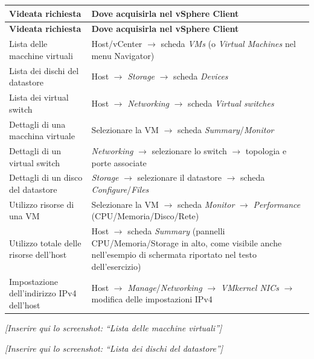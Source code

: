 \documentclass[11pt,a4paper]{article}
\begin{document}
\begin{center}
\begin{longtable}{p{6.2cm}p{6.6cm}}
\toprule
\textbf{Videata richiesta} & \textbf{Dove acquisirla nel vSphere Client} \\
\midrule
\endfirsthead
\toprule
\textbf{Videata richiesta} & \textbf{Dove acquisirla nel vSphere Client} \\
\midrule
\endhead
Lista delle macchine virtuali & Host/vCenter $\rightarrow$ scheda \emph{VMs} (o \emph{Virtual Machines} nel menu Navigator) \\
Lista dei dischi del datastore & Host $\rightarrow$ \emph{Storage} $\rightarrow$ scheda \emph{Devices} \\
Lista dei virtual switch & Host $\rightarrow$ \emph{Networking} $\rightarrow$ scheda \emph{Virtual switches} \\
Dettagli di una macchina virtuale & Selezionare la VM $\rightarrow$ scheda \emph{Summary}/\emph{Monitor} \\
Dettagli di un virtual switch & \emph{Networking} $\rightarrow$ selezionare lo switch $\rightarrow$ topologia e porte associate \\
Dettagli di un disco del datastore & \emph{Storage} $\rightarrow$ selezionare il datastore $\rightarrow$ scheda \emph{Configure}/\emph{Files} \\
Utilizzo risorse di una VM & Selezionare la VM $\rightarrow$ scheda \emph{Monitor} $\rightarrow$ \emph{Performance} (CPU/Memoria/Disco/Rete) \\
Utilizzo totale delle risorse dell'host & Host $\rightarrow$ scheda \emph{Summary} (pannelli CPU/Memoria/Storage in alto, come visibile anche nell'esempio di schermata riportato nel testo dell'esercizio) \\
Impostazione dell'indirizzo IPv4 dell'host & Host $\rightarrow$ \emph{Manage}/\emph{Networking} $\rightarrow$ \emph{VMkernel NICs} $\rightarrow$ modifica delle impostazioni IPv4 \\
\bottomrule
\end{longtable}
\end{center}

\begin{placeholder}
\centering
\vspace{2cm}
\textit{[Inserire qui lo screenshot: ``Lista delle macchine virtuali''] }
\vspace{2cm}
\end{placeholder}

\begin{placeholder}
\centering
\vspace{2cm}
\textit{[Inserire qui lo screenshot: ``Lista dei dischi del datastore'']}
\vspace{2cm}
\end{placeholder}
\end{document}
